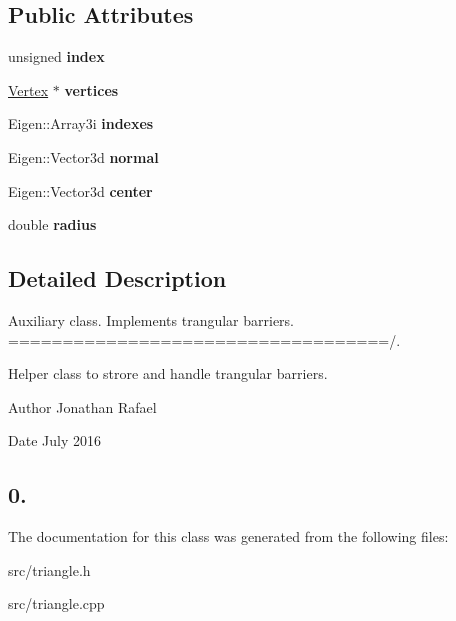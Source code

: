 \subsection*{Public Attributes}
\begin{DoxyCompactItemize}
\item 
\mbox{\label{class_triangle_a0f6509666826b8e916e8c884e6d92fdf}} 
unsigned {\bfseries index}
\item 
\mbox{\label{class_triangle_a1f17e61561dadac3966d2450dcdb001d}} 
\hyperlink{class_vertex}{Vertex} $\ast$ {\bfseries vertices}
\item 
\mbox{\label{class_triangle_a60f4999d8220f2e9f5361dfc2d3fa7d2}} 
Eigen\+::\+Array3i {\bfseries indexes}
\item 
\mbox{\label{class_triangle_a90c44b094ed4f5f663b3198f254b015a}} 
Eigen\+::\+Vector3d {\bfseries normal}
\item 
\mbox{\label{class_triangle_af85e52d2beb9feb49a4ded02061c056a}} 
Eigen\+::\+Vector3d {\bfseries center}
\item 
\mbox{\label{class_triangle_aca1dd750b3a5e13fd86947f318e9176a}} 
double {\bfseries radius}
\end{DoxyCompactItemize}


\subsection{Detailed Description}
Auxiliary class. Implements trangular barriers. ===================================/. 

Helper class to strore and handle trangular barriers. \begin{DoxyAuthor}{Author}
Jonathan Rafael 
\end{DoxyAuthor}
\begin{DoxyDate}{Date}
July 2016 \subsection*{0. }
\end{DoxyDate}


The documentation for this class was generated from the following files\+:\begin{DoxyCompactItemize}
\item 
src/triangle.\+h\item 
src/triangle.\+cpp\end{DoxyCompactItemize}
